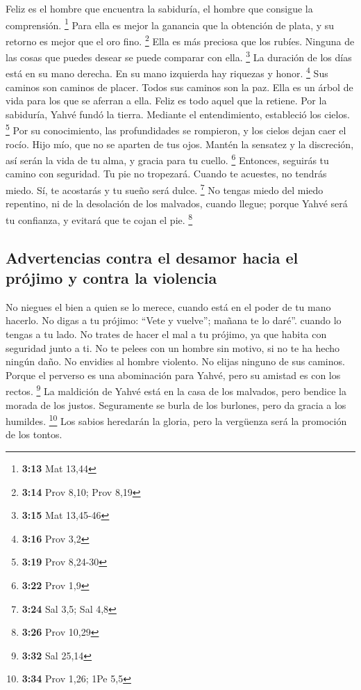 Feliz es el hombre que encuentra la sabiduría, el hombre
que consigue la comprensión. \footnote{\textbf{3:13} Mat 13,44}
 Para ella es mejor la ganancia que la obtención de
plata, y su retorno es mejor que el oro fino. \footnote{\textbf{3:14}
  Prov 8,10; Prov 8,19}  Ella es más preciosa que los
rubíes. Ninguna de las cosas que puedes desear se puede comparar con
ella. \footnote{\textbf{3:15} Mat 13,45-46}  La duración
de los días está en su mano derecha. En su mano izquierda hay riquezas y
honor. \footnote{\textbf{3:16} Prov 3,2}  Sus caminos son
caminos de placer. Todos sus caminos son la paz.  Ella es
un árbol de vida para los que se aferran a ella. Feliz es todo aquel que
la retiene.  Por la sabiduría, Yahvé fundó la tierra.
Mediante el entendimiento, estableció los cielos. \footnote{\textbf{3:19}
  Prov 8,24-30}  Por su conocimiento, las profundidades
se rompieron, y los cielos dejan caer el rocío.  Hijo
mío, que no se aparten de tus ojos. Mantén la sensatez y la discreción,
 así serán la vida de tu alma, y gracia para tu cuello.
\footnote{\textbf{3:22} Prov 1,9}  Entonces, seguirás tu
camino con seguridad. Tu pie no tropezará.  Cuando te
acuestes, no tendrás miedo. Sí, te acostarás y tu sueño será dulce.
\footnote{\textbf{3:24} Sal 3,5; Sal 4,8}  No tengas
miedo del miedo repentino, ni de la desolación de los malvados, cuando
llegue;  porque Yahvé será tu confianza, y evitará que te
cojan el pie. \footnote{\textbf{3:26} Prov 10,29}

\hypertarget{advertencias-contra-el-desamor-hacia-el-pruxf3jimo-y-contra-la-violencia}{%
\subsection{Advertencias contra el desamor hacia el prójimo y contra la
violencia}\label{advertencias-contra-el-desamor-hacia-el-pruxf3jimo-y-contra-la-violencia}}

 No niegues el bien a quien se lo merece, cuando está en
el poder de tu mano hacerlo.  No digas a tu prójimo:
``Vete y vuelve''; mañana te lo daré''. cuando lo tengas a tu lado.
 No trates de hacer el mal a tu prójimo, ya que habita
con seguridad junto a ti.  No te pelees con un hombre sin
motivo, si no te ha hecho ningún daño.  No envidies al
hombre violento. No elijas ninguno de sus caminos. 
Porque el perverso es una abominación para Yahvé, pero su amistad es con
los rectos. \footnote{\textbf{3:32} Sal 25,14}  La
maldición de Yahvé está en la casa de los malvados, pero bendice la
morada de los justos.  Seguramente se burla de los
burlones, pero da gracia a los humildes. \footnote{\textbf{3:34} Prov
  1,26; 1Pe 5,5}  Los sabios heredarán la gloria, pero la
vergüenza será la promoción de los tontos.

